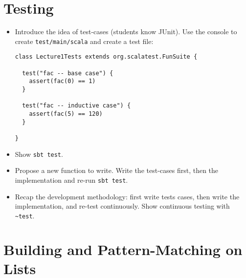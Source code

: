 \documentclass{book}
\begin{document}
\section{Testing}

\begin{itemize}

\item Introduce the idea of test-cases (students know JUnit). Use the console
to create \verb|test/main/scala| and create a test file:

\begin{verbatim}
class Lecture1Tests extends org.scalatest.FunSuite {

  test("fac -- base case") {
    assert(fac(0) == 1)
  }

  test("fac -- inductive case") {
    assert(fac(5) == 120)
  }

}
\end{verbatim}

\item Show \verb|sbt test|.

\item Propose a new function to write. Write the test-cases first, then
the implementation and re-run \verb|sbt test|.

\item Recap the development methodology: first write tests cases, then
write the implementation, and re-test continuously. Show continuous
testing with \verb|~test|.

\end{itemize}

\section{Building and Pattern-Matching on Lists}
\end{document}
